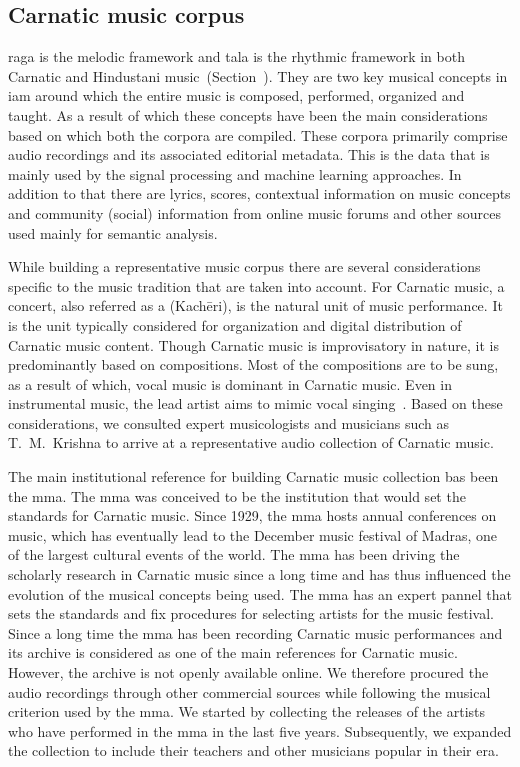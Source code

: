 \subsection{Carnatic music corpus}
\label{sec:corpus_carnatic_music_corpus}

\Gls{raga} is the melodic framework and \gls{tala} is the rhythmic framework in both Carnatic and Hindustani music~(Section~). They are two key musical concepts in \gls{iam} around which the entire music is composed, performed, organized and taught. As a result of which these concepts have been the main considerations based on which both the corpora are compiled. These corpora primarily comprise audio recordings and its associated editorial metadata. This is the data that is mainly used by the signal processing and machine learning approaches. In addition to that there are lyrics, scores, contextual information on music concepts and community (social) information from online music forums and other sources used mainly for semantic analysis.

While building a representative music corpus there are several considerations specific to the music tradition that are taken into account. For Carnatic music, a concert, also referred as a (Kach\={e}ri), is the natural unit of music performance. It is the unit typically considered for organization and digital distribution of Carnatic music content. Though Carnatic music is improvisatory in nature, it is predominantly based on compositions. Most of the compositions are to be sung, as a result of which, vocal music is dominant in Carnatic music. Even in instrumental music, the lead artist aims to mimic vocal singing~\citep{Viswanathan2004}. Based on these considerations, we consulted expert musicologists and musicians such as T.~M.~Krishna to arrive at a representative audio collection of Carnatic music.

The main institutional reference for building Carnatic music collection bas been the \gls{mma}. The \Gls{mma} was conceived to be the institution that would set the standards for Carnatic music. Since 1929, the \Gls{mma} hosts annual conferences on music, which has eventually lead to the December music festival of Madras, one of the largest cultural events of the world. The \gls{mma} has been driving the scholarly research in Carnatic music since a long time and has thus influenced the evolution of the musical concepts being used. The \gls{mma} has an expert pannel that sets the standards and fix procedures for selecting artists for the music festival. Since a long time the \gls{mma} has been recording Carnatic music performances and its archive is considered as one of the main references for Carnatic music. However, the archive is not openly available online. We therefore procured the audio recordings through other commercial sources while following the musical criterion used by the \gls{mma}. We started by collecting the releases of the artists who have performed in the \gls{mma} in the last five years. Subsequently, we expanded the collection to include their teachers and other musicians popular in their era. 

